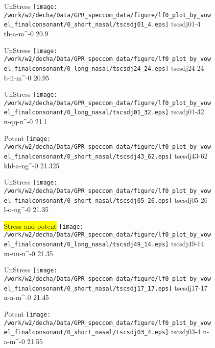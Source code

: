 \documentclass{article}
\begin{document}
\begin{figure}[t]
\begin{minipage}[b]{.24\textwidth}
UnStress
\centering
\texttt{[image: /work/w2/decha/Data/GPR\_speccom\_data/figure/lf0\_plot\_by\_vowel\_finalconsonant/0\_short\_nasal/tscsdj01\_4.eps]}
tscsdj01-4 th-a-m\textasciicircum-0 20.9
\end{minipage}
\begin{minipage}[b]{.24\textwidth}
UnStress
\centering
\texttt{[image: /work/w2/decha/Data/GPR\_speccom\_data/figure/lf0\_plot\_by\_vowel\_finalconsonant/0\_long\_nasal/tscsdj24\_24.eps]}
tscsdj24-24 b-ii-m\textasciicircum-0 20.95
\end{minipage}
\begin{minipage}[b]{.24\textwidth}
UnStress
\centering
\texttt{[image: /work/w2/decha/Data/GPR\_speccom\_data/figure/lf0\_plot\_by\_vowel\_finalconsonant/0\_long\_nasal/tscsdj01\_32.eps]}
tscsdj01-32 n-qq-n\textasciicircum-0 21.1
\end{minipage}
\begin{minipage}[b]{.24\textwidth}
\colorbox{Apricot}{Potent}
\centering
\texttt{[image: /work/w2/decha/Data/GPR\_speccom\_data/figure/lf0\_plot\_by\_vowel\_finalconsonant/0\_short\_nasal/tscsdj43\_62.eps]}
tscsdj43-62 khl-a-ng\textasciicircum-0 21.325
\end{minipage}
\end{figure}
\clearpage
\begin{figure}[t]
\begin{minipage}[b]{.24\textwidth}
UnStress
\centering
\texttt{[image: /work/w2/decha/Data/GPR\_speccom\_data/figure/lf0\_plot\_by\_vowel\_finalconsonant/0\_short\_nasal/tscsdj05\_26.eps]}
tscsdj05-26 l-o-ng\textasciicircum-0 21.35
\end{minipage}
\begin{minipage}[b]{.24\textwidth}
\colorbox{yellow}{Stress and potent}
\centering
\texttt{[image: /work/w2/decha/Data/GPR\_speccom\_data/figure/lf0\_plot\_by\_vowel\_finalconsonant/0\_long\_nasal/tscsdj49\_14.eps]}
tscsdj49-14 m-uu-n\textasciicircum-0 21.35
\end{minipage}
\begin{minipage}[b]{.24\textwidth}
UnStress
\centering
\texttt{[image: /work/w2/decha/Data/GPR\_speccom\_data/figure/lf0\_plot\_by\_vowel\_finalconsonant/0\_short\_nasal/tscsdj17\_17.eps]}
tscsdj17-17 n-a-m\textasciicircum-0 21.45
\end{minipage}
\begin{minipage}[b]{.24\textwidth}
\colorbox{Apricot}{Potent}
\centering
\texttt{[image: /work/w2/decha/Data/GPR\_speccom\_data/figure/lf0\_plot\_by\_vowel\_finalconsonant/0\_short\_nasal/tscsdj03\_4.eps]}
tscsdj03-4 n-a-m\textasciicircum-0 21.55
\end{minipage}
\end{figure}
\end{document}

